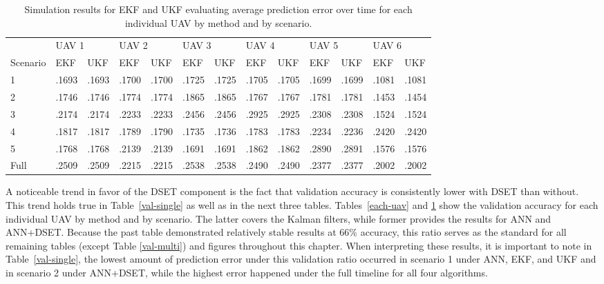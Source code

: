 \documentclass[12pt]{uthesis-v12}  %
\begin{document}
\begin{table}[!t]
\caption{Simulation results for EKF and UKF evaluating average prediction error over time for each individual UAV by method and by scenario.}
\renewcommand{\arraystretch}{1.3}
\centering
\resizebox{\textwidth}{!}
{\begin{tabular}{*{13}{l}}
\toprule
& \multicolumn{2}{l}{UAV 1} & \multicolumn{2}{l}{UAV 2} & \multicolumn{2}{l}{UAV 3} & \multicolumn{2}{l}{UAV 4} & \multicolumn{2}{l}{UAV 5} & \multicolumn{2}{l}{UAV 6} \\
Scenario & EKF & UKF & EKF & UKF & EKF & UKF & EKF & UKF & EKF & UKF & EKF & UKF \\ \midrule
1 & .1693 & .1693 & .1700 & .1700 & .1725 & .1725 & .1705 & .1705 & .1699 & .1699 & .1081 & .1081 \\
2 & .1746 & .1746 & .1774 & .1774 & .1865 & .1865 & .1767 & .1767 & .1781 & .1781 & .1453 & .1454 \\
3 & .2174 & .2174 & .2233 & .2233 & .2456 & .2456 & .2925 & .2925 & .2308 & .2308 & .1524 & .1524 \\
4 & .1817 & .1817 & .1789 & .1790 & .1735 & .1736 & .1783 & .1783 & .2234 & .2236 & .2420 & .2420 \\
5 & .1768 & .1768 & .2139 & .2139 & .1691 & .1691 & .1862 & .1862 & .2890 & .2891 & .1576 & .1576 \\
Full & .2509 & .2509 & .2215 & .2215 & .2538 & .2538 & .2490 & .2490 & .2377 & .2377 & .2002 & .2002 \\
\bottomrule
\end{tabular}}

\label{each-uavb}
\end{table}

A noticeable trend in favor of the DSET component is the fact that validation accuracy is consistently lower with DSET than without. This trend holds true in Table~\ref{val-single} as well as in the next three tables. Tables~\ref{each-uav} and \ref{each-uavb} show the validation accuracy for each individual UAV by method and by scenario. The latter covers the Kalman filters, while former provides the results for ANN and ANN+DSET. Because the past table demonstrated relatively stable results at 66\% accuracy, this ratio serves as the standard for all remaining tables (except Table \ref{val-multi}) and figures throughout this chapter. When interpreting these results, it is important to note in Table~\ref{val-single}, the lowest amount of prediction error under this validation ratio occurred in scenario 1 under ANN, EKF, and UKF and in scenario 2 under ANN+DSET, while the highest error happened under the full timeline for all four algorithms.
\end{document}
